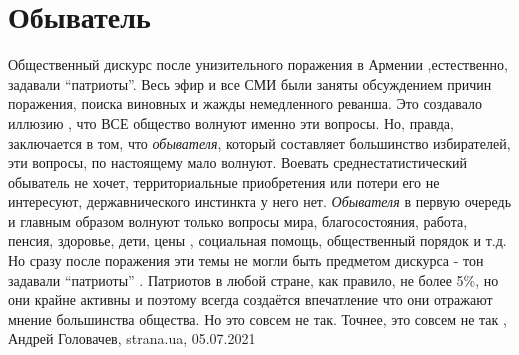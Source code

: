  
 
 
 
 
\chapter{Обыватель}

Общественный дискурс после унизительного поражения в Армении ,естественно,
задавали \enquote{патриоты}. Весь эфир и все СМИ были заняты обсуждением причин
поражения, поиска виновных и жажды немедленного реванша. Это создавало иллюзию
, что ВСЕ общество волнуют именно эти вопросы. Но, правда, заключается в том,
что \emph{обывателя}, который составляет большинство избирателей, эти вопросы, по
настоящему мало волнуют. Воевать среднестатистический обыватель не хочет,
территориальные приобретения или потери его не интересуют, державнического
инстинкта у него нет. \emph{Обывателя} в первую очередь и главным образом волнуют
только вопросы мира, благосостояния, работа, пенсия, здоровье, дети, цены ,
социальная помощь, общественный порядок и т.д. Но сразу после поражения эти
темы не могли быть предметом дискурса - тон задавали \enquote{патриоты} . Патриотов в
любой стране, как правило, не более 5\%, но они крайне активны и поэтому
всегда создаётся впечатление что они отражают мнение большинства общества. Но
это совсем не так. Точнее, это совсем не так
, 
Андрей Головачев, strana.ua, 05.07.2021
